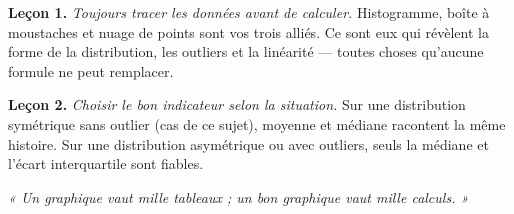 \documentclass[11pt,a4paper]{article}
\begin{document}
\vspace{0.5cm}

\begin{tcolorbox}[colback=bioyellow!50,colframe=bioaccent,title={\textbf{Pour conclure : deux leçons méthodologiques}},fonttitle=\bfseries]
\small
\textbf{Leçon 1.} \emph{Toujours tracer les données avant de calculer.} Histogramme, boîte à moustaches et nuage de points sont vos trois alliés. Ce sont eux qui révèlent la forme de la distribution, les outliers et la linéarité — toutes choses qu'aucune formule ne peut remplacer.

\medskip
\textbf{Leçon 2.} \emph{Choisir le bon indicateur selon la situation.} Sur une distribution symétrique sans outlier (cas de ce sujet), moyenne et médiane racontent la même histoire. Sur une distribution asymétrique ou avec outliers, seuls la médiane et l'écart interquartile sont fiables.

\medskip
\emph{« Un graphique vaut mille tableaux ; un bon graphique vaut mille calculs. »}
\end{tcolorbox}
\end{document}
